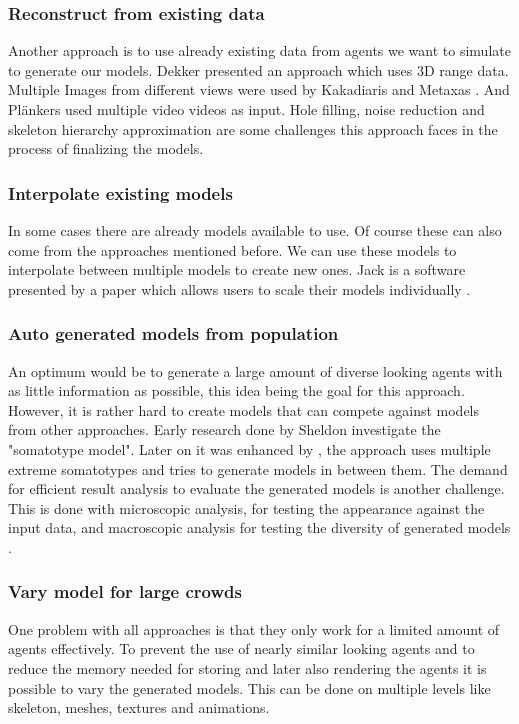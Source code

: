 \documentclass{acmsiggraph}               %
\begin{document}
\subsubsection{Reconstruct from existing data}
Another approach is to use already existing data  from agents we want to simulate to generate our models. Dekker  presented an approach which uses 3D range data. Multiple Images from different views were used by Kakadiaris and Metaxas . And Plänkers  used multiple video videos as input.
Hole filling, noise reduction and skeleton hierarchy approximation are some challenges this approach faces in the process of finalizing the models. 

\subsubsection{Interpolate existing models}
In some cases there are already models available to use. Of course these can also come from the approaches mentioned before. We can use these models to interpolate between multiple models to create new ones. Jack is a software presented by a paper which allows users to scale their models individually \cite{azuola_building_1994}.

\subsubsection{Auto generated models from population}
An optimum would be to generate a large amount of diverse looking agents with as little information as possible, this idea being the goal for this approach. However, it is rather hard to create models that can compete against models from other approaches. Early research done by Sheldon  investigate the "somatotype model". Later on it was enhanced by \cite{carter_somatotyping_1990}, the approach uses multiple extreme somatotypes and tries to generate models in between them. The demand for efficient result analysis to evaluate the generated models is another challenge. This is done with microscopic analysis, for testing the appearance against the input data, and macroscopic analysis for testing the diversity of generated models \cite{thalmann_crowd_2013}. 

\subsubsection{Vary model for large crowds} 
One problem with all approaches is that they only work for a limited amount of agents effectively. To prevent the use of nearly similar looking agents and to reduce the memory needed for storing and later also rendering the agents it is possible to vary the generated models. This can be done on multiple levels like skeleton, meshes, textures and animations. 
\cite{thalmann_crowd_2013}
\end{document}
